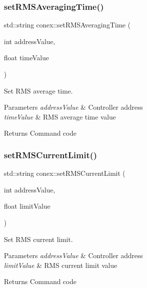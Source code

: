 \subsubsection{\texorpdfstring{set\+R\+M\+S\+Averaging\+Time()}{setRMSAveragingTime()}}
{\footnotesize\ttfamily std\+::string conex\+::set\+R\+M\+S\+Averaging\+Time (\begin{DoxyParamCaption}\item[{int}]{address\+Value,  }\item[{float}]{time\+Value }\end{DoxyParamCaption})}



Set R\+MS average time. 


\begin{DoxyParams}{Parameters}
{\em address\+Value} & Controller address \\
\hline
{\em time\+Value} & R\+MS average time value \\
\hline
\end{DoxyParams}
\begin{DoxyReturn}{Returns}
Command code 
\end{DoxyReturn}
\mbox{\label{namespaceconex_a3552f23ef324fc207a4b8ea8ca79d63c}} 
\subsubsection{\texorpdfstring{set\+R\+M\+S\+Current\+Limit()}{setRMSCurrentLimit()}}
{\footnotesize\ttfamily std\+::string conex\+::set\+R\+M\+S\+Current\+Limit (\begin{DoxyParamCaption}\item[{int}]{address\+Value,  }\item[{float}]{limit\+Value }\end{DoxyParamCaption})}



Set R\+MS current limit. 


\begin{DoxyParams}{Parameters}
{\em address\+Value} & Controller address \\
\hline
{\em limit\+Value} & R\+MS current limit value \\
\hline
\end{DoxyParams}
\begin{DoxyReturn}{Returns}
Command code 
\end{DoxyReturn}
\mbox{\label{namespaceconex_a81886be7ef4e25e26a4a222d4716ea7f}} 
